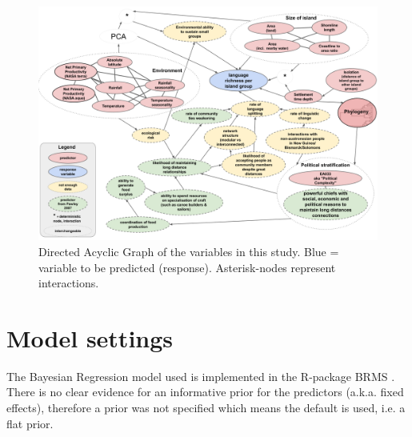 \documentclass[unnumsec,webpdf,modern,medium]{oup-authoring-template}
\begin{document}
\begin{appendices}



\begin{figure} 

\includegraphics[width=\textwidth]{Predicting_lgs_DAG_full}
\caption{Directed Acyclic Graph of the variables in this study. Blue = variable to be predicted (response). Asterisk-nodes represent interactions.}
\label{Predicting_lgs_DAG_full}
\end{figure}


\section{Model settings}
\label{appendix_model_settings}
The Bayesian Regression model used is implemented in the R-package BRMS \citep{burkner2017brms}. There is no clear evidence for an informative prior for the predictors (a.k.a. fixed effects), therefore a prior was not specified which means the default is used, i.e. a flat prior.


\end{appendices}
\end{document}
